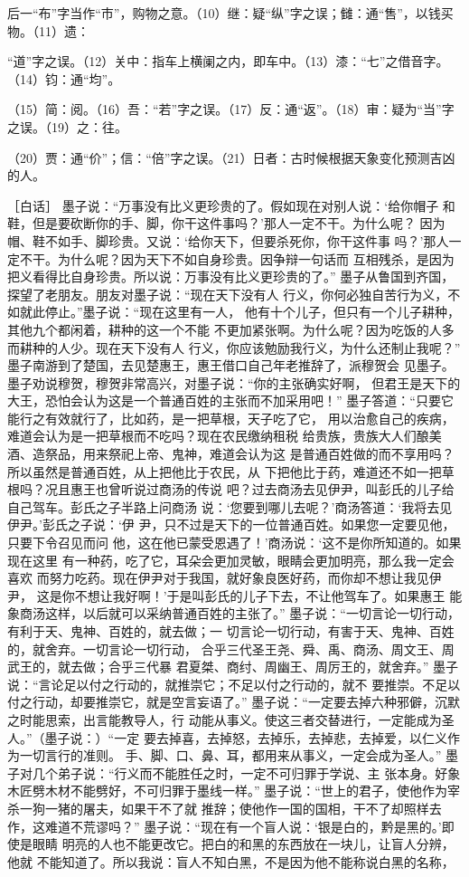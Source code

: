 \documentclass[12pt,UTF8]{ctexbook}
\begin{document}
后一“布”字当作“市”，购物之意。（10）继：疑“纵”字之误；雠：通“售”，以钱买物。（11）遗： 

“道”字之误。（12）关中：指车上横阑之内，即车中。（13）漆：“七”之借音字。（14）钧：通“均”。 

（15）简：阅。（16）吾：“若”字之误。（17）反：通“返”。（18）审：疑为“当”字之误。（19）之：往。 

（20）贾：通“价”；信：“倍”字之误。（21）日者：古时候根据天象变化预测吉凶的人。 

［白话］ 
墨子说：“万事没有比义更珍贵的了。假如现在对别人说：‘给你帽子 
和鞋，但是要砍断你的手、脚，你干这件事吗？’那人一定不干。为什么呢？ 
因为帽、鞋不如手、脚珍贵。又说：‘给你天下，但要杀死你，你干这件事 
吗？’那人一定不干。为什么呢？因为天下不如自身珍贵。因争辩一句话而 
互相残杀，是因为把义看得比自身珍贵。所以说：万事没有比义更珍贵的了。” 
墨子从鲁国到齐国，探望了老朋友。朋友对墨子说：“现在天下没有人 
行义，你何必独自苦行为义，不如就此停止。”墨子说：“现在这里有一人， 
他有十个儿子，但只有一个儿子耕种，其他九个都闲着，耕种的这一个不能 
不更加紧张啊。为什么呢？因为吃饭的人多而耕种的人少。现在天下没有人 
行义，你应该勉励我行义，为什么还制止我呢？” 
墨子南游到了楚国，去见楚惠王，惠王借口自己年老推辞了，派穆贺会 
见墨子。墨子劝说穆贺，穆贺非常高兴，对墨子说：“你的主张确实好啊， 
但君王是天下的大王，恐怕会认为这是一个普通百姓的主张而不加采用吧！” 
墨子答道：“只要它能行之有效就行了，比如药，是一把草根，天子吃了它， 
用以治愈自己的疾病，难道会认为是一把草根而不吃吗？现在农民缴纳租税 
给贵族，贵族大人们酿美酒、造祭品，用来祭祀上帝、鬼神，难道会认为这 
是普通百姓做的而不享用吗？所以虽然是普通百姓，从上把他比于农民，从 
下把他比于药，难道还不如一把草根吗？况且惠王也曾听说过商汤的传说 
吧？过去商汤去见伊尹，叫彭氏的儿子给自己驾车。彭氏之子半路上问商汤 
说：‘您要到哪儿去呢？’商汤答道：‘我将去见伊尹。’彭氏之子说：‘伊 
尹，只不过是天下的一位普通百姓。如果您一定要见他，只要下令召见而问 
他，这在他已蒙受恩遇了！’商汤说：‘这不是你所知道的。如果现在这里 
有一种药，吃了它，耳朵会更加灵敏，眼睛会更加明亮，那么我一定会喜欢 
而努力吃药。现在伊尹对于我国，就好象良医好药，而你却不想让我见伊尹， 
这是你不想让我好啊！’于是叫彭氏的儿子下去，不让他驾车了。如果惠王 
能象商汤这样，以后就可以采纳普通百姓的主张了。” 
墨子说：“一切言论一切行动，有利于天、鬼神、百姓的，就去做；一 
切言论一切行动，有害于天、鬼神、百姓的，就舍弃。一切言论一切行动， 
合乎三代圣王尧、舜、禹、商汤、周文王、周武王的，就去做；合乎三代暴 
君夏桀、商纣、周幽王、周厉王的，就舍弃。” 
墨子说：“言论足以付之行动的，就推崇它；不足以付之行动的，就不 
要推崇。不足以付之行动，却要推崇它，就是空言妄语了。” 
墨子说：“一定要去掉六种邪僻，沉默之时能思索，出言能教导人，行 
动能从事义。使这三者交替进行，一定能成为圣人。”（墨子说：）“一定 
要去掉喜，去掉怒，去掉乐，去掉悲，去掉爱，以仁义作为一切言行的准则。 
手、脚、口、鼻、耳，都用来从事义，一定会成为圣人。” 
墨子对几个弟子说：“行义而不能胜任之时，一定不可归罪于学说、主 
张本身。好象木匠劈木材不能劈好，不可归罪于墨线一样。” 
墨子说：“世上的君子，使他作为宰杀一狗一猪的屠夫，如果干不了就 
推辞；使他作一国的国相，干不了却照样去作，这难道不荒谬吗？” 
墨子说：“现在有一个盲人说：‘银是白的，黔是黑的。’即使是眼睛 
明亮的人也不能更改它。把白的和黑的东西放在一块儿，让盲人分辨，他就 
不能知道了。所以我说：盲人不知白黑，不是因为他不能称说白黑的名称， 
\end{document}
